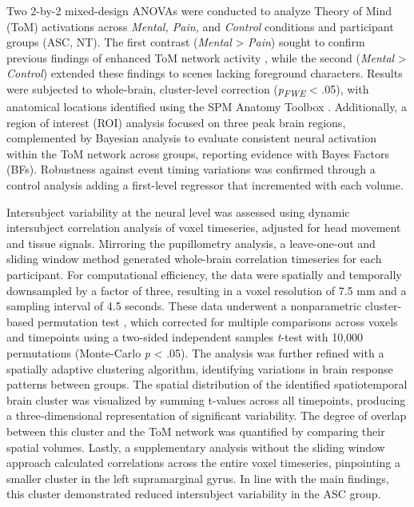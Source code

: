 Two 2-by-2 mixed-design ANOVAs were conducted to analyze Theory of Mind (ToM) activations across \textit{Mental, Pain,} and \textit{Control} conditions and participant groups (ASC, NT). The first contrast (\textit{Mental} > \textit{Pain}) sought to confirm previous findings of enhanced ToM network activity \citep{jacoby2016}, while the second (\textit{Mental} > \textit{Control}) extended these findings to scenes lacking foreground characters. Results were subjected to whole-brain, cluster-level correction (\textit{p\textsubscript{FWE}} < .05), with anatomical locations identified using the SPM Anatomy Toolbox \citep{eickhoff2005}. Additionally, a region of interest (ROI) analysis focused on three peak brain regions, complemented by Bayesian analysis \citep{jasp2022} to evaluate consistent neural activation within the ToM network across groups, reporting evidence with Bayes Factors (BFs). Robustness against event timing variations was confirmed through a control analysis adding a first-level regressor that incremented with each volume.

Intersubject variability at the neural level was assessed using dynamic intersubject correlation analysis of voxel timeseries, adjusted for head movement and tissue signals. Mirroring the pupillometry analysis, a leave-one-out and sliding window method generated whole-brain correlation timeseries for each participant. For computational efficiency, the data were spatially and temporally downsampled by a factor of three, resulting in a voxel resolution of 7.5 mm and a sampling interval of 4.5 seconds. These data underwent a nonparametric cluster-based permutation test \citep{maris2007}, which corrected for multiple comparisons across voxels and timepoints using a two-sided independent samples \textit{t}-test with 10,000 permutations (Monte-Carlo \textit{p} < .05). The analysis was further refined with a spatially adaptive clustering algorithm, identifying variations in brain response patterns between groups. The spatial distribution of the identified spatiotemporal brain cluster was visualized by summing t-values across all timepoints, producing a three-dimensional representation of significant variability. The degree of overlap between this cluster and the ToM network was quantified by comparing their spatial volumes. Lastly, a supplementary analysis without the sliding window approach calculated correlations across the entire voxel timeseries, pinpointing a smaller cluster in the left supramarginal gyrus. In line with the main findings, this cluster demonstrated reduced intersubject variability in the ASC group.

